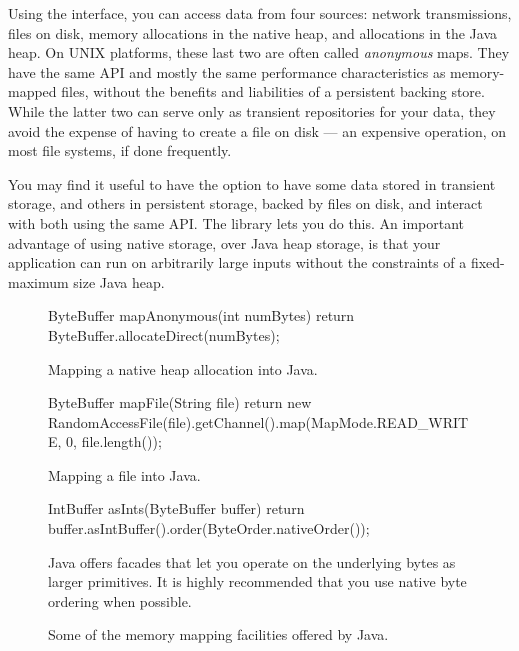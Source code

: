 Using the  interface, you can access data from four sources:
network transmissions, files on disk, memory allocations in the native heap, and
allocations in the Java heap. On UNIX platforms, these last two are often called
\emph{anonymous} maps. They have the same API and mostly the same performance
characteristics as memory-mapped files, without the benefits and liabilities of
a persistent backing store. While the latter two can serve only as transient
repositories for your data, they avoid the expense of having to create a file on
disk --- an expensive operation, on most file systems, if done frequently.

You may find it useful to have the option to have some data stored in transient
storage, and others in persistent storage, backed by files on disk, and interact
with both using the same API. The  library lets you do this. An
important advantage of using native  storage, over Java heap
storage, is that your application can run on arbitrarily large inputs without the
constraints of a fixed-maximum size Java heap.


\begin{figure}
\centering
\begin{subfloat}
\begin{minipage}{0.99\textwidth}
\begin{figurelisting}
ByteBuffer mapAnonymous(int numBytes) {
  return ByteBuffer.allocateDirect(numBytes);
}
\end{figurelisting}
\end{minipage}
\caption{Mapping a native heap allocation into Java.}
\end{subfloat}
\begin{subfloat}
\begin{minipage}{0.99\textwidth}
\begin{figurelisting}
ByteBuffer mapFile(String file) {
  return new RandomAccessFile(file).getChannel().map(MapMode.READ_WRITE, 0, file.length());
}
\end{figurelisting}
\end{minipage}
\caption{Mapping a file into Java.}
\label{fig:java-nio-mapfile}
\end{subfloat}
\begin{subfloat}
\begin{minipage}{0.99\textwidth}
\begin{figurelisting}
IntBuffer asInts(ByteBuffer buffer) {
  return buffer.asIntBuffer().order(ByteOrder.nativeOrder());
}
\end{figurelisting}
\end{minipage}
\caption{Java offers facades that let you operate on the underlying bytes as
larger primitives. It is highly recommended that you use native byte ordering
when possible.}
\label{fig:java-nio-asintbuffer}
\end{subfloat}
\caption{Some of the memory mapping facilities offered by Java.}
\label{fig:java-nio}
\end{figure}

